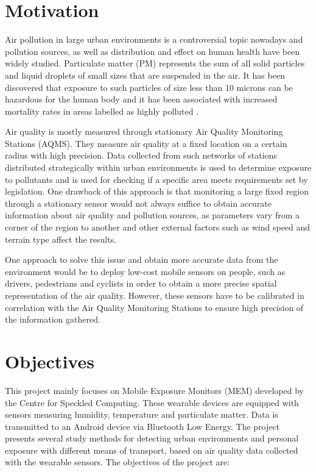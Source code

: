 \documentclass[bsc,frontabs,twoside,singlespacing, parskip,deptreport]{infthesis}     %
\begin{document}
\section{Motivation}

Air pollution in large urban environments is a controversial topic nowadays and pollution sources, as well as distribution and effect on human health have been widely studied. Particulate matter (PM) represents the sum of all solid particles and liquid droplets of small sizes that are suspended in the air. It has been discovered that exposure to such particles of size less than 10 microns can be hazardous for the human body and it has been associated with increased mortality rates in areas labelled as highly polluted \cite{Dockery1994}.

Air quality is mostly measured through stationary Air Quality Monitoring Stations (AQMS). They measure air quality at a fixed location on a certain radius with high precision. Data collected from such networks of stations distributed strategically within urban environments is used to determine exposure to pollutants and is used for checking if a specific area meets requirements set by legislation. One drawback of this approach is that monitoring a large fixed region through a stationary sensor would not always suffice to obtain accurate information about air quality and pollution sources, as parameters vary from a corner of the region to another and other external factors such as wind speed and terrain type affect the results.

One approach to solve this issue and obtain more accurate data from the environment would be to deploy low-cost mobile sensors on people, such as drivers, pedestrians and cyclists in order to obtain a more precise spatial representation of the air quality. However, these sensors have to be calibrated in correlation with the Air Quality Monitoring Stations to ensure high precision of the information gathered.

\section{Objectives}

This project mainly focuses on Mobile Exposure Monitors (MEM) developed by the Centre for Speckled Computing. These wearable devices are equipped with sensors measuring humidity, temperature and particulate matter. Data is transmitted to an Android device via Bluetooth Low Energy. The project presents several study methods for detecting urban environments and personal exposure with different means of transport, based on air quality data collected with the wearable sensors. The objectives of the project are:
\end{document}

